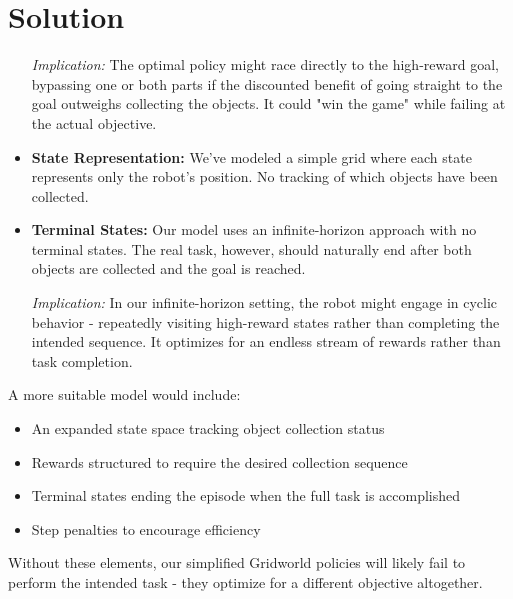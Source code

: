 \documentclass[submit]{../harvardml}
\newenvironment{solution}
  {\color{blue}\section*{Solution}}
{}
\begin{document}
\begin{solution}
\begin{itemize}
    \textit{Implication:} The optimal policy might race directly to the high-reward goal, bypassing one or both parts if the discounted benefit of going straight to the goal outweighs collecting the objects. It could "win the game" while failing at the actual objective.
    
    \item \textbf{State Representation:} We've modeled a simple grid where each state represents only the robot's position. No tracking of which objects have been collected.
        
    \item \textbf{Terminal States:} Our model uses an infinite-horizon approach with no terminal states. The real task, however, should naturally end after both objects are collected and the goal is reached.
    
    \textit{Implication:} In our infinite-horizon setting, the robot might engage in cyclic behavior - repeatedly visiting high-reward states rather than completing the intended sequence. It optimizes for an endless stream of rewards rather than task completion.
\end{itemize}

A more suitable model would include:
\begin{itemize}
    \item An expanded state space tracking object collection status
    \item Rewards structured to require the desired collection sequence
    \item Terminal states ending the episode when the full task is accomplished
    \item Step penalties to encourage efficiency
\end{itemize}

Without these elements, our simplified Gridworld policies will likely fail to perform the intended task - they optimize for a different objective altogether.
\end{solution}
\end{document}
